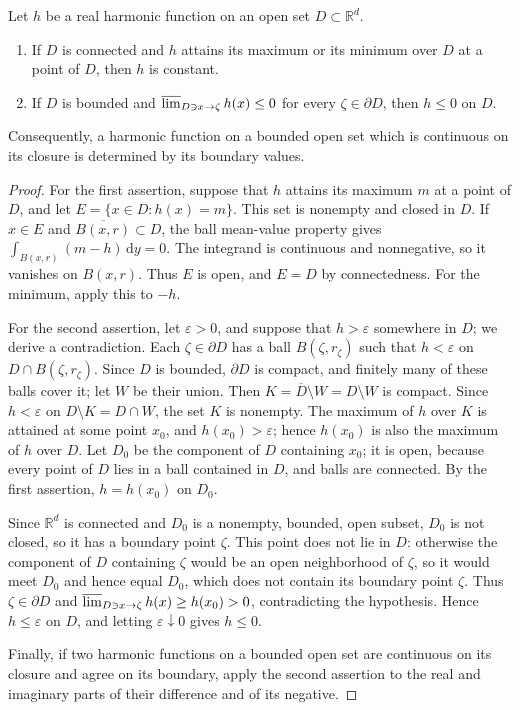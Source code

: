 \begin{proposition}\label{prop:harmonic-maximum}
Let $h$ be a real harmonic function on an open set $D\subset\mathbb R^d$.
\begin{enumerate}
\item If $D$ is connected and $h$ attains its maximum or its minimum over $D$ at a point of $D$, then $h$ is constant.
\item If $D$ is bounded and $\varlimsup_{D\ni x\to\zeta}h(x)\leq0$ for every $\zeta\in\partial D$, then $h\leq0$ on $D$.
\end{enumerate}
Consequently, a harmonic function on a bounded open set which is continuous on its closure is determined by its boundary values.
\end{proposition}
\begin{proof}
For the first assertion, suppose that $h$ attains its maximum $m$ at a point of $D$, and let $E=\{x\in D:h(x)=m\}$. This set is nonempty and closed in $D$. If $x\in E$ and $\overline{B(x,r)}\subset D$, the ball mean-value property gives $\int_{B(x,r)}(m-h)\,\mathrm dy=0$. The integrand is continuous and nonnegative, so it vanishes on $B(x,r)$. Thus $E$ is open, and $E=D$ by connectedness. For the minimum, apply this to $-h$.

For the second assertion, let $\varepsilon>0$, and suppose that $h>\varepsilon$ somewhere in $D$; we derive a contradiction. Each $\zeta\in\partial D$ has a ball $B(\zeta,r_\zeta)$ such that $h<\varepsilon$ on $D\cap B(\zeta,r_\zeta)$. Since $D$ is bounded, $\partial D$ is compact, and finitely many of these balls cover it; let $W$ be their union. Then $K=\overline D\setminus W=D\setminus W$ is compact. Since $h<\varepsilon$ on $D\setminus K=D\cap W$, the set $K$ is nonempty. The maximum of $h$ over $K$ is attained at some point $x_0$, and $h(x_0)>\varepsilon$; hence $h(x_0)$ is also the maximum of $h$ over $D$. Let $D_0$ be the component of $D$ containing $x_0$; it is open, because every point of $D$ lies in a ball contained in $D$, and balls are connected. By the first assertion, $h=h(x_0)$ on $D_0$.

Since $\mathbb R^d$ is connected and $D_0$ is a nonempty, bounded, open subset, $D_0$ is not closed, so it has a boundary point $\zeta$. This point does not lie in $D$: otherwise the component of $D$ containing $\zeta$ would be an open neighborhood of $\zeta$, so it would meet $D_0$ and hence equal $D_0$, which does not contain its boundary point $\zeta$. Thus $\zeta\in\partial D$ and $\varlimsup_{D\ni x\to\zeta}h(x)\geq h(x_0)>0$, contradicting the hypothesis. Hence $h\leq\varepsilon$ on $D$, and letting $\varepsilon\downarrow0$ gives $h\leq0$.

Finally, if two harmonic functions on a bounded open set are continuous on its closure and agree on its boundary, apply the second assertion to the real and imaginary parts of their difference and of its negative.
\end{proof}

